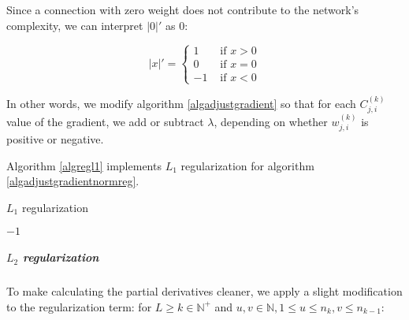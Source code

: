 \documentclass[titlepage]{article}
\begin{document}
            Since a connection with zero weight does not contribute to the
            network's complexity, we can interpret $|0|'$ as $0$:

            \begin{equation}
              |x|' =
                \begin{cases}
                  1 & \text{ if } x > 0 \\
                  0 & \text{ if } x = 0 \\
                  -1 & \text{ if } x < 0
                \end{cases}
            \end{equation}

            In other words, we modify algorithm \ref{algadjustgradient} so that
            for each $C_{j,i}^{(k)}$ value of the gradient, we add or subtract
            $\lambda$, depending on whether $w_{j,i}^{(k)}$ is positive or
            negative.

            Algorithm \ref{algregl1} implements $L_1$ regularization for
            algorithm \ref{algadjustgradientnormreg}.

            \begin{algorithm}
              \caption{$L_1$ regularization} \label{algregl1}
              \begin{algorithmic}
                    \State {}
                  \EndIf

                    \State {}
                  \EndIf

                  \State \Return $-1$
                \EndFunction
              \end{algorithmic}
            \end{algorithm}

          \subparagraph{$L_2$ regularization}

            To make calculating the partial derivatives cleaner, we apply a
            slight modification to the regularization term: for
            $L \geq k \in \mathbb{N}^+$ and
            $u, v \in \mathbb{N}, 1 \leq u \leq n_k, v \leq n_{k - 1}$:
\end{document}
